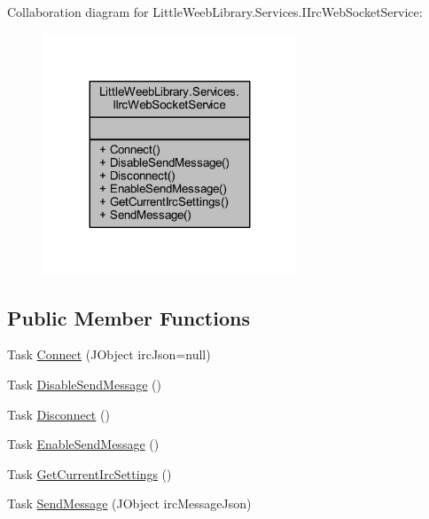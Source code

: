 Collaboration diagram for Little\+Weeb\+Library.\+Services.\+I\+Irc\+Web\+Socket\+Service\+:\nopagebreak
\begin{figure}[H]
\begin{center}
\leavevmode
\includegraphics[width=215pt]{interface_little_weeb_library_1_1_services_1_1_i_irc_web_socket_service__coll__graph}
\end{center}
\end{figure}
\subsection*{Public Member Functions}
\begin{DoxyCompactItemize}
\item 
Task \mbox{\hyperlink{interface_little_weeb_library_1_1_services_1_1_i_irc_web_socket_service_a1d34ec7c04db6779c41ee6a78d602760}{Connect}} (J\+Object irc\+Json=null)
\item 
Task \mbox{\hyperlink{interface_little_weeb_library_1_1_services_1_1_i_irc_web_socket_service_a68ae0e96a4de9e8ad3c43f4dd89546b8}{Disable\+Send\+Message}} ()
\item 
Task \mbox{\hyperlink{interface_little_weeb_library_1_1_services_1_1_i_irc_web_socket_service_ac3bedeb941873ec5211357841a1e6e92}{Disconnect}} ()
\item 
Task \mbox{\hyperlink{interface_little_weeb_library_1_1_services_1_1_i_irc_web_socket_service_ad873d87b345c52b09672423c707862ac}{Enable\+Send\+Message}} ()
\item 
Task \mbox{\hyperlink{interface_little_weeb_library_1_1_services_1_1_i_irc_web_socket_service_abcd6f0217a73e1533c3b3fc8160b54fa}{Get\+Current\+Irc\+Settings}} ()
\item 
Task \mbox{\hyperlink{interface_little_weeb_library_1_1_services_1_1_i_irc_web_socket_service_a79d2a4282565f178600ba77fac451e9f}{Send\+Message}} (J\+Object irc\+Message\+Json)
\end{DoxyCompactItemize}


